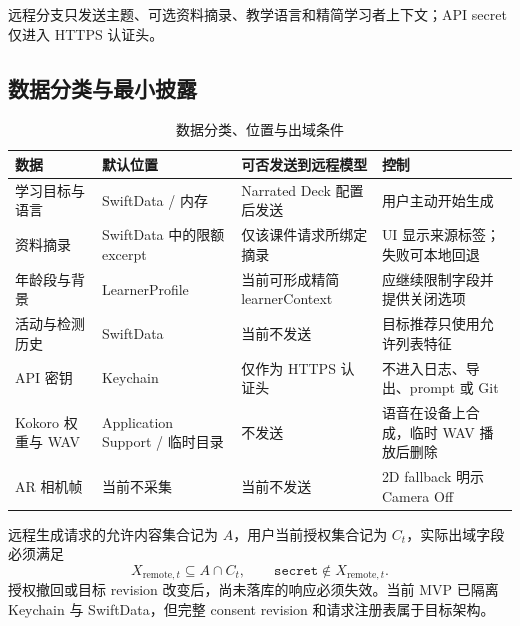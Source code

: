 \documentclass[11pt,a4paper,fontset=none]{ctexart}
\begin{document}
远程分支只发送主题、可选资料摘录、教学语言和精简学习者上下文；API secret 仅进入 HTTPS 认证头。

\subsection{数据分类与最小披露}
\begin{table}[htbp]
\centering
\small
\caption{数据分类、位置与出域条件}
\begin{tabularx}{\textwidth}{P{30mm}P{34mm}Y P{31mm}}
\toprule
数据 & 默认位置 & 可否发送到远程模型 & 控制 \\
\midrule
学习目标与语言 & SwiftData / 内存 & Narrated Deck 配置后发送 & 用户主动开始生成 \\
资料摘录 & SwiftData 中的限额 excerpt & 仅该课件请求所绑定摘录 & UI 显示来源标签；失败可本地回退 \\
年龄段与背景 & LearnerProfile & 当前可形成精简 learnerContext & 应继续限制字段并提供关闭选项 \\
活动与检测历史 & SwiftData & 当前不发送 & 目标推荐只使用允许列表特征 \\
API 密钥 & Keychain & 仅作为 HTTPS 认证头 & 不进入日志、导出、prompt 或 Git \\
Kokoro 权重与 WAV & Application Support / 临时目录 & 不发送 & 语音在设备上合成，临时 WAV 播放后删除 \\
AR 相机帧 & 当前不采集 & 当前不发送 & 2D fallback 明示 Camera Off \\
\bottomrule
\end{tabularx}
\end{table}

远程生成请求的允许内容集合记为 $A$，用户当前授权集合记为 $C_t$，实际出域字段必须满足
\begin{equation}
  X_{\mathrm{remote},t} \subseteq A \cap C_t,
  \qquad
  \texttt{secret} \notin X_{\mathrm{remote},t}.
  \label{eq:min-disclosure}
\end{equation}
授权撤回或目标 revision 改变后，尚未落库的响应必须失效。当前 MVP 已隔离 Keychain 与 SwiftData，但完整 consent revision 和请求注册表属于目标架构。
\end{document}
